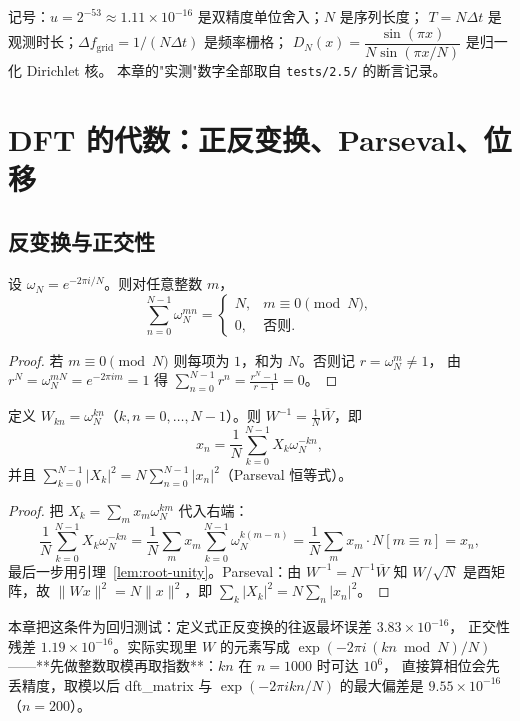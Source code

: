 记号：$u=2^{-53}\approx1.11\times10^{-16}$ 是双精度单位舍入；$N$ 是序列长度；
$T=N\Delta t$ 是观测时长；$\Delta f_{\text{grid}}=1/(N\Delta t)$ 是频率栅格；
$D_N(x)=\dfrac{\sin(\pi x)}{N\sin(\pi x/N)}$ 是归一化 Dirichlet 核。
本章的"实测"数字全部取自 \texttt{tests/2.5/} 的断言记录。

\section{DFT 的代数：正反变换、Parseval、位移}

\subsection{反变换与正交性}

\begin{lemma}[根的单位性]
\label{lem:root-unity}
设 $\omega_N=e^{-2\pi i/N}$。则对任意整数 $m$，
\[
\sum_{n=0}^{N-1}\omega_N^{mn}=
\begin{cases}N,& m\equiv0\pmod N,\\ 0,& \text{否则}.\end{cases}
\]
\end{lemma}

\begin{proof}
若 $m\equiv0\pmod N$ 则每项为 $1$，和为 $N$。否则记 $r=\omega_N^m\ne1$，
由 $r^N=\omega_N^{mN}=e^{-2\pi im}=1$ 得
$\sum_{n=0}^{N-1}r^n=\frac{r^N-1}{r-1}=0$。
\end{proof}

\begin{theorem}[反变换公式与正交性]
\label{thm:inverse}
定义 $W_{kn}=\omega_N^{kn}$（$k,n=0,\dots,N-1$）。则 $W^{-1}=\frac1N\overline W$，即
\[
x_n=\frac1N\sum_{k=0}^{N-1}X_k\omega_N^{-kn},
\]
并且 $\sum_{k=0}^{N-1}|X_k|^2=N\sum_{n=0}^{N-1}|x_n|^2$（Parseval 恒等式）。
\end{theorem}

\begin{proof}
把 $X_k=\sum_m x_m\omega_N^{km}$ 代入右端：
\[
\frac1N\sum_{k=0}^{N-1}X_k\omega_N^{-kn}
=\frac1N\sum_m x_m\sum_{k=0}^{N-1}\omega_N^{k(m-n)}
=\frac1N\sum_m x_m\cdot N[m\equiv n]=x_n,
\]
最后一步用引理~\ref{lem:root-unity}。Parseval：由 $W^{-1}=N^{-1}\overline W$ 知
$W/\sqrt N$ 是酉矩阵，故 $\|Wx\|^2=N\|x\|^2$，即 $\sum_k|X_k|^2=N\sum_n|x_n|^2$。
\end{proof}

本章把这条件为回归测试：定义式正反变换的往返最坏误差 $3.83\times10^{-16}$，
正交性残差 $1.19\times10^{-16}$。实际实现里 $W$ 的元素写成
$\exp(-2\pi i\,(kn\bmod N)/N)$——**先做整数取模再取指数**：$kn$ 在 $n=1000$ 时可达 $10^6$，
直接算相位会先丢精度，取模以后 dft\_matrix 与 $\exp(-2\pi ikn/N)$ 的最大偏差是
$9.55\times10^{-16}$（$n=200$）。

